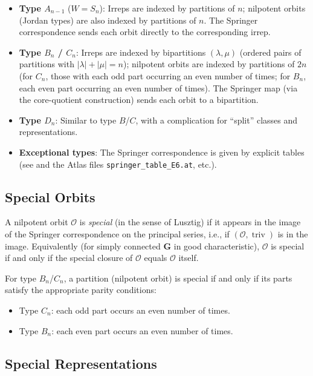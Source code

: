 \documentclass[12pt]{amsart}
\newcommand{\triv}{\operatorname{triv}}
\newcommand{\bfG}{\mathbf{G}}
\newcommand{\cO}{\mathcal{O}}
\begin{document}
\begin{itemize}
  \item \textbf{Type $A_{n-1}$} ($W = S_n$): Irreps are indexed by partitions
        of $n$; nilpotent orbits (Jordan types) are also indexed by partitions
        of $n$.  The Springer correspondence sends each orbit directly to the
        corresponding irrep.

  \item \textbf{Type $B_n$ / $C_n$}: Irreps are indexed by bipartitions
        $(\lambda, \mu)$ (ordered pairs of partitions with $|\lambda| +
        |\mu| = n$); nilpotent orbits are indexed by partitions of $2n$ (for
        $C_n$, those with each odd part occurring an even number of times;
        for $B_n$, each even part occurring an even number of times). The
        Springer map (via the core-quotient construction) sends each orbit
        to a bipartition.

  \item \textbf{Type $D_n$}: Similar to type $B$/$C$, with a complication
        for ``split'' classes and representations.

  \item \textbf{Exceptional types}: The Springer correspondence is given by
        explicit tables (see \cite{Carter:finite} and the Atlas files
        \texttt{springer\_table\_E6.at}, etc.).
\end{itemize}

\subsection{Special Orbits}

A nilpotent orbit $\cO$ is \emph{special} (in the sense of Lusztig) if it
appears in the image of the Springer correspondence on the principal series,
i.e., if $(\cO, \triv)$ is in the image.  Equivalently (for simply connected
$\bfG$ in good characteristic), $\cO$ is special if and only if the special
closure of $\cO$ equals $\cO$ itself.

For type $B_n$/$C_n$, a partition (nilpotent orbit) is special if and only if
its parts satisfy the appropriate parity conditions:
\begin{itemize}
  \item Type $C_n$: each odd part occurs an even number of times.
  \item Type $B_n$: each even part occurs an even number of times.
\end{itemize}

\subsection{Special Representations}
\end{document}
